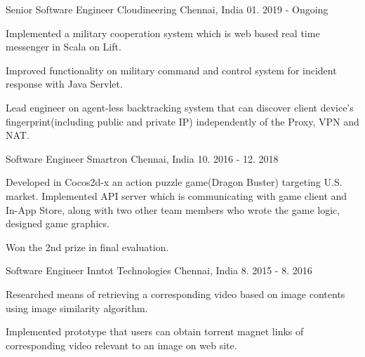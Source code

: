


\begin{cventries}


\cventry
{Senior Software Engineer} %
{Cloudineering} %
{Chennai, India} %
{01. 2019 - Ongoing} %
{ %
\begin{cvitems}
\item {Implemented a military cooperation system which is web based real time messenger in Scala on Lift.}
\item {Improved functionality on military command and control system for incident response with Java Servlet.}
\item {Lead engineer on agent-less backtracking system that can discover client device's fingerprint(including public and private IP) independently of the Proxy, VPN and NAT.}
\end{cvitems}
}


\cventry
{Software Engineer} %
{Smartron} %
{Chennai, India} %
{10. 2016 - 12. 2018} %
{ %
\begin{cvitems}
\item {Developed in Cocos2d-x an action puzzle game(Dragon Buster) targeting U.S. market. Implemented API server which is communicating with game client and In-App Store, along with two other team members who wrote the game logic, designed game graphics.}
\item {Won the 2nd prize in final evaluation.}
\end{cvitems}
}


\cventry
{Software Engineer} %
{Inntot Technologies} %
{Chennai, India} %
{8. 2015 - 8. 2016} %
{ %
\begin{cvitems}
\item {Researched means of retrieving a corresponding video based on image contents using image similarity algorithm.}
\item {Implemented prototype that users can obtain torrent magnet links of corresponding video relevant to an image on web site.}
\end{cvitems} 
}


\end{cventries}